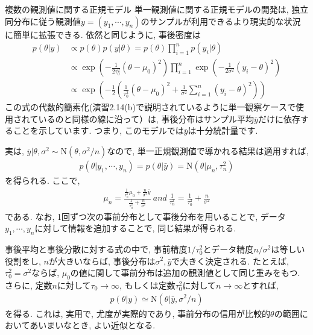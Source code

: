 \documentclass[10pt,dvipdfmx,a4]{beamer}
\newcommand{\eq}[1]{\begin{align}#1\end{align}}
\newcommand{\eqn}[1]{\begin{align*}#1\end{align*}}
\begin{document}

\begin{frame}{複数の観測値に関する正規モデル}
単一観測値に関する正規モデルの開発は, 独立同分布に従う観測値$y=(y_1,\cdots,y_n)$のサンプルが利用できるより現実的な状況に簡単に拡張できる.
依然と同じように, 事後密度は
\eqn{p(\theta|y)&\propto p(\theta)p(y|\theta)=p(\theta)\prod_{i=1}^n p(y_i|\theta)\\
&\propto \exp\left(-\frac{1}{2\tau_0^2}(\theta-\mu_0)^2\right) \prod_{i=1}^n \exp\left(-\frac{1}{2\sigma^2}(y_i-\theta)^2\right)\\
&\propto \exp\left(-\frac{1}{2}  \left( \frac{1}{\tau_0^2}(\theta-\mu_0)^2+\frac{1}{\sigma^2}\sum_{i=1}^n (y_i-\theta)^2\right)\right)}
この式の代数的簡素化(演習2.14(b)で説明されているように単一観察ケースで使用されているのと同様の線に沿って）は, 事後分布はサンプル平均$\bar{y}$だけに依存することを示しています.
つまり, このモデルでは$\bar{y}$は十分統計量です.
\end{frame}


\begin{frame}
実は, $\bar{y}|\theta, \sigma^2 \sim \text{N}(\theta,\sigma^2/n)$なので, 単一正規観測値で導かれる結果は適用すれば, 
\eq{p(\theta|y_1,\cdots,y_n)=p(\theta|\bar{y})=\text{N}(\theta|\mu_n,\tau_n^2)}
を得られる.
ここで,
\eq{\mu_n=\frac{\tfrac{1}{\tau_0^2}\mu_0+\frac{n}{\sigma^2}\bar{y}}{\frac{1}{\tau_0^2}+\frac{n}{\sigma^2}}\ and\ \frac{1}{\tau_n^2}=\frac{1}{\tau_0^2}+\frac{n}{\sigma^2}}
である.
なお, 1回ずつ次の事前分布として事後分布を用いることで, データ$y_1,\cdots,y_n$に対して情報を追加することで, 同じ結果が得られる.

事後平均と事後分散に対する式の中で, 事前精度$1/\tau_0^2$とデータ精度$n/\sigma^2$は等しい役割をし, $n$が大きいならば, 事後分布は$\sigma^2, \bar{y}$で大きく決定される.
たとえば, $\tau_0^2=\sigma^2$ならば, $\mu_0$の値に関して事前分布は追加の観測値として同じ重みをもつ.
さらに, 定数$n$に対して$\tau_0\rightarrow \infty$, もしくは定数$\tau_0^2$に対して$n\rightarrow \infty$とすれば,
\eq{p(\theta|y)\simeq \text{N}(\theta|\bar{y},\sigma^2/n)}
を得る.
これは, 実用で, 尤度が実際的であり, 事前分布の信用が比較的$\theta$の範囲においてあいまいなとき, よい近似となる.
\end{frame}
\end{document}
